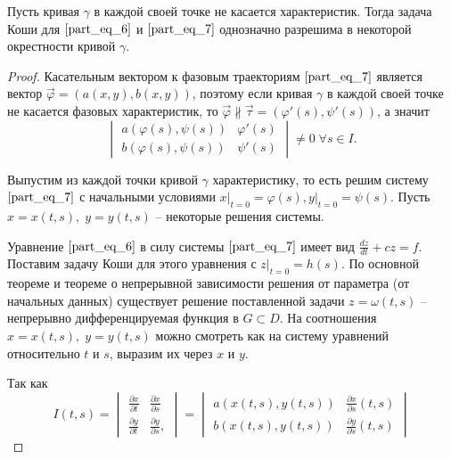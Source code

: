 \begin{theorem}
    Пусть кривая $\gamma$ в каждой своей точке не касается характеристик. Тогда задача Коши для $\eqref{part_eq_6}$ и $\eqref{part_eq_7}$ однозначно разрешима в некоторой окрестности кривой $\gamma$.
\end{theorem}
\begin{proof}
    Касательным вектором к фазовым траекториям $\eqref{part_eq_7}$ является вектор $\vec{\varphi} = \left( a(x, y), b(x, y) \right)$, поэтому если кривая $\gamma$ в каждой своей точке не касается фазовых характеристик, то $\vec{\varphi} \nparallel \vec{\tau} = (\varphi'(s), \psi'(s))$, а значит
    \begin{equation}
        \begin{vmatrix}
            a(\varphi(s), \psi(s)) & \varphi'(s) \\
            b(\varphi(s), \psi(s)) & \psi'(s)
        \end{vmatrix} \neq 0\; \forall s \in I.
        \label{part_eq_8}
    \end{equation}
    
    Выпустим из каждой точки кривой $\gamma$ характеристику, то есть решим систему $\eqref{part_eq_7}$ с начальными условиями $x \big|_{t = 0} = \varphi(s), y \big|_{t = 0} = \psi(s)$. Пусть $x = x(t, s), \; y = y(t, s)$ -- некоторые решения системы.
    
    Уравнение $\eqref{part_eq_6}$ в силу системы $\eqref{part_eq_7}$ имеет вид $\frac{dz}{dt} + cz = f$. Поставим задачу Коши для этого уравнения с $z \big|_{t = 0} = h(s)$. По основной теореме и теореме о непрерывной зависимости решения от параметра (от начальных данных) существует решение поставленной задачи $z = \omega (t, s)$ -- непрерывно дифференцируемая функция в $G \subset D$. На соотношения $x = x(t, s), \; y = y(t, s)$ можно смотреть как на систему уравнений относительно $t$ и $s$, выразим их через $x$ и $y$.

    Так как
    \begin{equation*}
        I(t, s) =
        \begin{vmatrix}
            \frac{\partial x}{\partial t} & \frac{\partial x}{\partial s} \\
            \frac{\partial y}{\partial t} & \frac{\partial y}{\partial s},
        \end{vmatrix} =
        \begin{vmatrix}
            a(x(t, s), y(t, s)) & \frac{\partial x}{\partial s}(t, s) \\
            b(x(t, s), y(t, s)) & \frac{\partial y}{\partial s}(t, s)
        \end{vmatrix}
    \end{equation*}


\end{proof}

